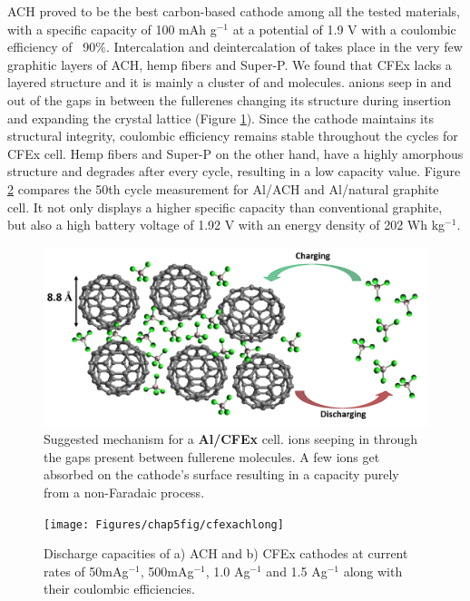 ACH proved to be the best carbon-based cathode among all the tested materials, with a specific capacity of 100 mAh g$^{-1}$ at a potential of 1.9 V with a coulombic efficiency of ~90$\%$. Intercalation and deintercalation of  takes place in the very few graphitic layers of ACH, hemp fibers and Super-P. 
We found that CFEx lacks a layered structure and it is mainly a cluster of  and  molecules.  anions seep in and out of the gaps in between the fullerenes changing its structure during insertion and expanding the crystal lattice (Figure \ref{Figures/chap5fig:cfexmech}). Since the cathode maintains its structural integrity, coulombic efficiency remains stable throughout the cycles for CFEx cell. Hemp fibers and Super-P on the other hand, have a highly amorphous structure and degrades after every cycle, resulting in a low capacity value. Figure \ref{Figures/chap5fig:cfexachlong} compares the 50th cycle measurement for Al/ACH and Al/natural graphite cell. It not only displays a higher specific capacity than conventional graphite, but also a high battery voltage of 1.92 V with an energy density of 202 Wh kg$^{-1}$.
 \begin{figure}[tbh!]
  \centering
  \includegraphics[width=\textwidth]{Figures/chap5fig/cfexmech}
    \caption{Suggested mechanism for a \textbf{Al/CFEx} cell.  ions seeping in through the gaps present between fullerene molecules. A few  ions get absorbed on the cathode's surface resulting in a capacity purely from a non-Faradaic process.}
  \label{Figures/chap5fig:cfexmech}
\end{figure}
\begin{figure}[tbh!]
  \centering
  \texttt{[image: Figures/chap5fig/cfexachlong]}
    \caption{Discharge capacities of a) ACH and b) CFEx cathodes at current rates of 50mAg$^{-1}$, 500mAg$^{-1}$, 1.0 Ag$^{-1}$ and 1.5 Ag$^{-1}$ along with their coulombic efficiencies. }
  \label{Figures/chap5fig:cfexachlong}
\end{figure}
